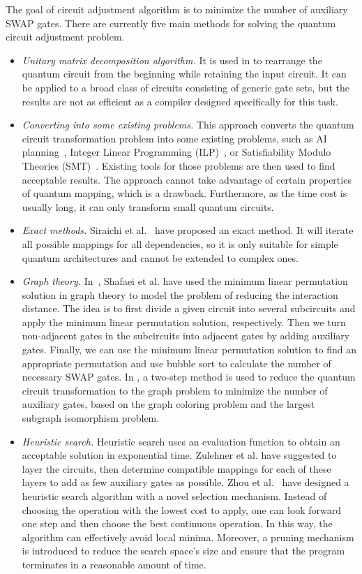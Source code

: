 \documentclass[journal]{IEEEtran}
\begin{document}
The goal of circuit adjustment algorithm is to minimize the number of auxiliary SWAP gates. There are currently five main methods for solving the quantum circuit adjustment problem.
\begin{itemize}
  \item
\emph{Unitary matrix decomposition algorithm.} It is used in \cite{2019CNOT,2019Quantum} to rearrange the quantum circuit from the beginning while retaining the input circuit. It can be applied to a broad class of circuits consisting of generic gate sets, but the results are not as efficient as a compiler designed specifically for this task.
\item
\emph{Converting into some existing problems.} This approach converts the quantum circuit transformation problem into some existing problems, such as AI planning~\cite{2017Temporal,2018Integer}, Integer Linear Programming (ILP)~\cite{2019Almeida}, or Satisfiability Modulo Theories (SMT)~\cite{2019Murali}. Existing tools for those problems are then used to find acceptable results. The approach cannot take advantage of certain properties of quantum mapping, which is a drawback. Furthermore, as the time cost is usually long, it can only transform small quantum circuits.
\item
\emph{Exact methods.}
Siraichi et al.~\cite{2018QubitSiraichi} have proposed an exact method. It will iterate all possible mappings for all dependencies, so it is only suitable for simple quantum architectures and cannot be extended to complex ones.
\item
\emph{Graph theory.} 
In~\cite{Shafaei2013}, Shafaei et al. have used the minimum linear permutation solution in graph theory to model the problem of reducing the interaction distance. The idea is to first divide a given circuit into several subcircuits and apply the minimum linear permutation solution, respectively. Then we turn non-adjacent gates in the subcircuits into adjacent gates by adding auxiliary gates. Finally, we can use the minimum linear permutation solution to find an appropriate permutation and use bubble sort to calculate the number of necessary SWAP gates. In \cite{Guerreschi2018,Matsuo2019}, a two-step method is used to reduce the quantum circuit transformation to the graph problem to minimize the number of auxiliary gates, based on the graph coloring problem and the largest subgraph isomorphism problem.
\item
\emph{Heuristic search.}
Heuristic search uses an evaluation function to obtain an acceptable solution in exponential time. Zulehner et al. \cite{Zulehner2017} have suggested to layer the circuits, then determine compatible mappings for each of these layers to add as few auxiliary gates as possible. Zhou et al.~\cite{Xiangzhen2020} have designed a heuristic search algorithm with a novel selection mechanism. Instead of choosing the operation with the lowest cost to apply, one can look forward one step and then choose the best continuous operation. In this way, the algorithm can effectively avoid local minima. Moreover, a pruning mechanism is introduced to reduce the search space's size and ensure that the program terminates in a reasonable amount of time.


\end{itemize}
\end{document}

